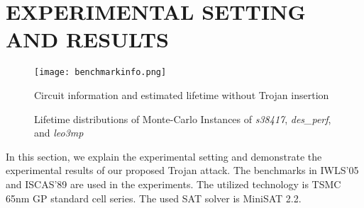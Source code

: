 \section{EXPERIMENTAL SETTING AND RESULTS}
\label{sec:mot}
\begin{figure}
	\centering
	\texttt{[image: benchmarkinfo.png]}
	\caption{Circuit information and estimated lifetime without Trojan insertion}
	\label{fig:benchmark}
\end{figure}

\begin{figure*}[!ht]
    \centering
    \hspace{0.1cm}
    \hspace{0.1cm}
    \hspace{0.1cm}
    \caption{Lifetime distributions of Monte-Carlo Instances of \textit{s38417}, \textit{des\_perf}, and \textit{leo3mp}}
    \label{fig:exp}
\end{figure*}


In this section, we explain the experimental setting and demonstrate the experimental results of our proposed Trojan attack. The benchmarks in IWLS'05 and ISCAS'89 are used in the experiments. The utilized technology is TSMC 65nm GP standard cell series. The used SAT solver is MiniSAT 2.2. %

